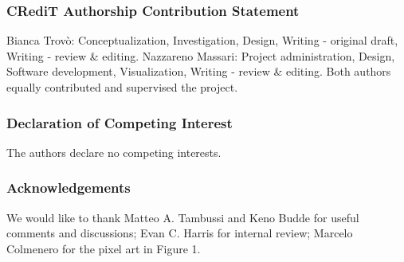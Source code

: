 \documentclass[runningheads]{llncs}
\begin{document}
\subsubsection{CRediT Authorship Contribution Statement}
 Bianca Trovò: Conceptualization, Investigation, Design, Writing - original draft, Writing - review \& editing. Nazzareno Massari: Project administration, Design, Software development, Visualization, Writing - review \& editing. Both authors equally contributed and supervised the project.

\subsubsection{Declaration of Competing Interest}
The authors declare no competing interests.

\subsubsection{Acknowledgements} We would like to thank Matteo A. Tambussi and Keno Budde for useful comments and discussions; Evan C. Harris for internal review; Marcelo Colmenero for the pixel art in Figure 1.


%
%


\end{document}
